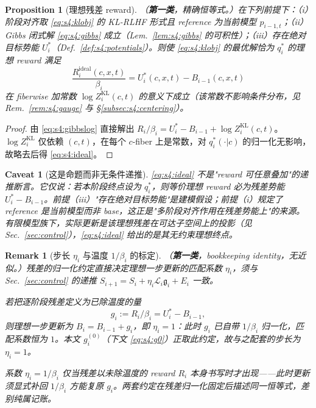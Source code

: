 \documentclass[11pt,a4paper]{article}
\newtheorem{proposition}[theorem]{Proposition}
\newtheorem{remark}[theorem]{Remark}
\newtheorem{caveat}[theorem]{Caveat}
\newcommand{\cL}{\mathcal{L}}   %
\newcommand{\gres}{\bm{\mathfrak{g}}} %
\begin{document}
\begin{proposition}[理想残差 reward]\label{prop:s4:ideal}
（\textbf{第一类}，精确恒等式。）在下列前提下：（i）阶段对齐取 \eqref{eq:s4:klobj} 的 KL-RLHF 形式且 reference 为\emph{当前}模型 $p_{i-1,t}$；（ii）Gibbs 闭式解 \eqref{eq:s4:gibbs} 成立（Lem.~\ref{lem:s4:gibbs} 的可积性）；（iii）存在绝对目标势能 $U_i^*$（Def.~\ref{def:s4:potentials}）。则使 \eqref{eq:s4:klobj} 的最优解恰为 $q_i^*$ 的理想 reward 满足
\begin{equation}\label{eq:s4:ideal}
\boxed{\;\frac{R_i^{\mathrm{ideal}}(c,x,t)}{\beta_i}=U_i^*(c,x,t)-B_{i-1}(c,x,t)\;}
\end{equation}
在 fiberwise 加常数 $\log Z_i^{\mathrm{KL}}(c,t)$ 的意义下成立（该常数不影响条件分布，见 Rem.~\ref{rem:s4:gauge} 与 \S\ref{subsec:s4:centering}）。
\end{proposition}

\begin{proof}
由 \eqref{eq:s4:gibbslog} 直接解出 $R_i/\beta_i=U_i^*-B_{i-1}+\log Z_i^{\mathrm{KL}}(c,t)$。$\log Z_i^{\mathrm{KL}}$ 仅依赖 $(c,t)$，在每个 $c$-fiber 上是常数，对 $q_i^*(\cdot|c)$ 的归一化无影响，故略去后得 \eqref{eq:s4:ideal}。
\end{proof}

\begin{caveat}[这是命题而非无条件递推]\label{cav:s4:notrecursion}
\eqref{eq:s4:ideal} 不是"reward 可任意叠加"的递推断言。它仅说：\emph{若}本阶段终点设为 $q_i^*$，\emph{则}等价理想 reward 必为残差势能 $U_i^*-B_{i-1}$。前提（iii）"存在绝对目标势能"是建模假设；前提（i）规定了 reference 是当前模型而非 base，这正是"多阶段对齐作用在残差势能上"的来源。有限模型族下，实际更新是该理想残差在可达子空间上的投影（见 Sec.~\ref{sec:control}），\eqref{eq:s4:ideal} 给出的是其\emph{无约束}理想终点。
\end{caveat}

\begin{remark}[步长 $\eta_i$ 与温度 $1/\beta_i$ 的标定]\label{rem:s4:etacalib}
（\textbf{第一类}，bookkeeping identity，无近似。）残差的归一化约定直接决定理想一步更新的匹配系数 $\eta_i$，须与 Sec.~\ref{sec:control} 的递推 $S_{i+1}=S_i+\eta_i\cL_i\gres_i+E_i$ 一致。

若把逐阶段残差定义为\emph{已除温度}的量
\[
g_i:=R_i/\beta_i=U_i^*-B_{i-1},
\]
则理想一步更新为 $B_i=B_{i-1}+g_i$，即 $\boxed{\eta_i=1}$：此时 $g_i$ 已自带 $1/\beta_i$ 归一化，匹配系数恒为 $1$。本文 $g_i^{(0)}$（下文 \eqref{eq:s4:g0}）正取此约定，故与之配套的步长为 $\eta_i=1$。

系数 $\eta_i=1/\beta_i$ \emph{仅当}残差以未除温度的 reward $R_i$ 本身书写时才出现——此时更新须显式补回 $1/\beta_i$ 方能复原 $g_i$。两套约定在残差归一化固定后描述同一恒等式，差别纯属记账。
\end{remark}
\end{document}
